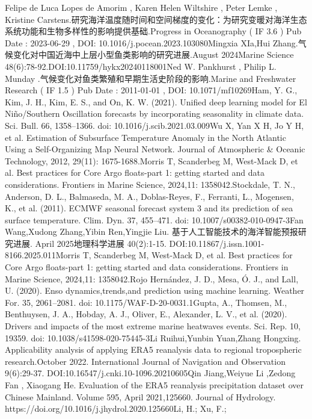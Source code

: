 \documentclass[
  12pt,
]{article}
\begin{document}
Felipe de Luca Lopes de Amorim , Karen Helen Wiltshire , Peter Lemke ,
Kristine
Carstens.研究海洋温度随时间和空间梯度的变化：为研究变暖对海洋生态系统功能和生物多样性的影响提供基础.Progress
in Oceanography ( IF 3.6 ) Pub Date : 2023-06-29 , DOI:
10.1016/j.pocean.2023.103080Mingxia XIa,Hui
Zhang.气候变化对中国近海中上层小型鱼类影响的研究进展.August 2024Marine
Science 48(6):78-92.DOI:10.11759/hykx20240118001Ned W. Pankhurst ,
Philip L. Munday .气候变化对鱼类繁殖和早期生活史阶段的影响.Marine and
Freshwater Research ( IF 1.5 ) Pub Date : 2011-01-01 , DOI:
10.1071/mf10269Ham, Y. G., Kim, J. H., Kim, E. S., and On, K. W. (2021).
Unified deep learning model for El Niño/Southern Oscillation forecasts
by incorporating seasonality in climate data. Sci. Bull. 66, 1358--1366.
doi: 10.1016/j.scib.2021.03.009Wu X, Yan X H, Jo Y H, et al. Estimation
of Subsurface Temperature Anomaly in the North Atlantic Using a
Self-Organizing Map Neural Network. Journal of Atmospheric \& Oceanic
Technology, 2012, 29(11): 1675-1688.Morris T, Scanderbeg M, West-Mack D,
et al. Best practices for Core Argo floats-part 1: getting started and
data considerations. Frontiers in Marine Science, 2024,11:
1358042.Stockdale, T. N., Anderson, D. L., Balmaseda, M. A.,
Doblas-Reyes, F., Ferranti, L., Mogensen, K., et al. (2011). ECMWF
seasonal forecast system 3 and its prediction of sea surface
temperature. Clim. Dyn. 37, 455--471. doi: 10.1007/s00382-010-0947-3Fan
Wang,Xudong Zhang,Yibin Ren,Yingjie Liu.
基于人工智能技术的海洋智能预报研究进展. April 2025地理科学进展
40(2):1-15. DOI:10.11867/j.issn.1001-8166.2025.011Morris T, Scanderbeg
M, West-Mack D, et al. Best practices for Core Argo floats-part 1:
getting started and data considerations. Frontiers in Marine Science,
2024,11: 1358042.Rojo Hernández, J. D., Mesa, Ó. J., and Lall, U.
(2020). Enso dynamics,trends,and prediction using machine learning.
Weather For. 35, 2061--2081. doi: 10.1175/WAF-D-20-0031.1Gupta, A.,
Thomsen, M., Benthuysen, J. A., Hobday, A. J., Oliver, E., Alexander, L.
V., et al. (2020). Drivers and impacts of the most extreme marine
heatwaves events. Sci. Rep. 10, 19359. doi: 10.1038/s41598-020-75445-3Li
Ruihui,Yunbin Yuan,Zhang Hongxing. Applicability analysis of applying
ERA5 reanalysis data to regional tropospheric research.October 2022.
International Journal of Navigation and Observation 9(6):29-37.
DOI:10.16547/j.cnki.10-1096.20210605Qin Jiang,Weiyue Li ,Zedong Fan ,
Xiaogang He. Evaluation of the ERA5 reanalysis precipitation dataset
over Chinese Mainland. Volume 595, April 2021,125660. Journal of
Hydrology. https://doi.org/10.1016/j.jhydrol.2020.125660Li, H.; Xu, F.;
\end{document}
